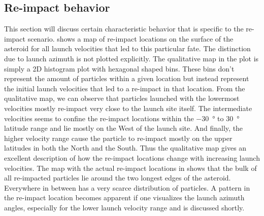 \subsection{Re-impact behavior}
This section will discuss certain characteristic behavior that is specific to the re-impact scenario.  shows a map of re-impact locations on the surface of the asteroid for all launch velocities that led to this particular fate. The distinction due to launch azimuth is not plotted explicitly. The qualitative map in the plot is simply a 2D histogram plot with hexagonal shaped bins. These bins don't represent the amount of particles within a given location but instead represent the initial launch velocities that led to a re-impact in that location. From the qualitative map, we can observe that particles launched with the lowermost velocities mostly re-impact very close to the launch site itself. The intermediate velocities seems to confine the re-impact locations within the \SI{-30}{\degree} to \SI{+30}{\degree} latitude range and lie mostly on the West of the launch site. And finally, the higher velocity range cause the particle to re-impact mostly on the upper latitudes in both the North and the South. Thus the qualitative map gives an excellent description of how the re-impact locations change with increasing launch velocities. The map with the actual re-impact locations in  shows that the bulk of all re-impacted particles lie around the two longest edges of the asteroid. Everywhere in between has a very scarce distribution of particles. A pattern in the re-impact location becomes apparent if one visualizes the launch azimuth angles, especially for the lower launch velocity range and is discussed shortly.
